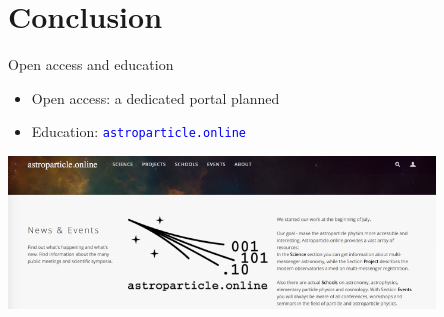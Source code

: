 \section{Conclusion}

\begin{frame}{Open access and education}
    \vspace{-4em}
    \begin{itemize}
        \item Open access: a dedicated portal planned
        \item Education: \textcolor{blue}{\texttt{astroparticle.online}}
    \end{itemize}
    \centering
    \includegraphics[width=0.85\textwidth]{pics/astro_onl.png}
\end{frame}

